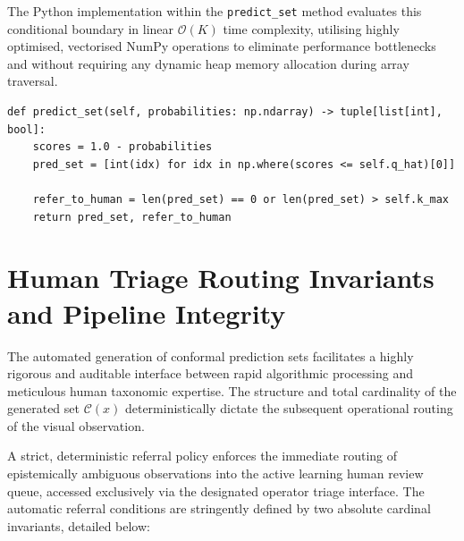 The Python implementation within the \texttt{predict\_set} method evaluates this conditional boundary in linear $\mathcal{O}(K)$ time complexity, utilising highly optimised, vectorised NumPy operations to eliminate performance bottlenecks and without requiring any dynamic heap memory allocation during array traversal.

\begin{listing}[htbp]
\begin{verbatim}
def predict_set(self, probabilities: np.ndarray) -> tuple[list[int], bool]:
    scores = 1.0 - probabilities
    pred_set = [int(idx) for idx in np.where(scores <= self.q_hat)[0]]

    refer_to_human = len(pred_set) == 0 or len(pred_set) > self.k_max
    return pred_set, refer_to_human
\end{verbatim}
\caption{Conformal set construction and conditional human referral evaluation.}
\label{lst:predict_set}
\end{listing}

\section{Human Triage Routing Invariants and Pipeline Integrity}
\label{sec:human_triage_routing}

The automated generation of conformal prediction sets facilitates a highly rigorous and auditable interface between rapid algorithmic processing and meticulous human taxonomic expertise. The structure and total cardinality of the generated set $\mathcal{C}(x)$ deterministically dictate the subsequent operational routing of the visual observation.

A strict, deterministic referral policy enforces the immediate routing of epistemically ambiguous observations into the active learning human review queue, accessed exclusively via the designated operator triage interface. The automatic referral conditions are stringently defined by two absolute cardinal invariants, detailed below:

